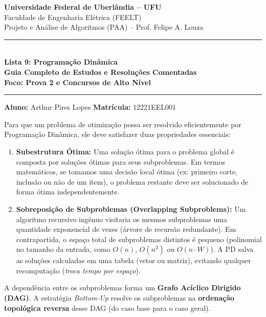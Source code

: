 \documentclass[11pt,a4paper]{article}
\begin{document}
\begin{center}
    {\Large \textbf{Universidade Federal de Uberlândia -- UFU}}\\[2pt]
    {\large Faculdade de Engenharia Elétrica (FEELT)}\\[2pt]
    {\large Projeto e Análise de Algoritmos (PAA) -- Prof. Felipe A. Louza}\\[4pt]
    \rule{\textwidth}{1pt}\\[5pt]
    {\LARGE \textbf{Lista 9: Programação Dinâmica}}\\[3pt]
    {\large \textbf{Guia Completo de Estudos e Resoluções Comentadas}}\\[3pt]
    \textbf{Foco: Prova 2 e Concursos de Alto Nível}\\[2pt]
    \rule{\textwidth}{0.5pt}
\end{center}

\vspace{0.1cm}
\noindent \textbf{Aluno:} Arthur Pires Lopes \quad \textbf{Matrícula:} 12221EEL001

\vspace{0.3cm}

\begin{teoria}
Para que um problema de otimização possa ser resolvido eficientemente por Programação Dinâmica, ele deve satisfazer duas propriedades essenciais:
\begin{enumerate}
    \item \textbf{Subestrutura Ótima:} Uma solução ótima para o problema global é composta por soluções ótimas para seus subproblemas. Em termos matemáticos, se tomamos uma decisão local ótima (ex: primeiro corte, inclusão ou não de um item), o problema restante deve ser solucionado de forma ótima independentemente.
    \item \textbf{Sobreposição de Subproblemas (Overlapping Subproblems):} Um algoritmo recursivo ingênuo visitaria os mesmos subproblemas uma quantidade exponencial de vezes (árvore de recursão redundante). Em contrapartida, o espaço total de subproblemas distintos é pequeno (polinomial no tamanho da entrada, como $O(n)$, $O(n^2)$ ou $O(n \cdot W)$). A PD salva as soluções calculadas em uma tabela (vetor ou matriz), evitando qualquer recomputação (\emph{troca tempo por espaço}).
\end{enumerate}
A dependência entre os subproblemas forma um \textbf{Grafo Acíclico Dirigido (DAG)}. A estratégia \emph{Bottom-Up} resolve os subproblemas na \textbf{ordenação topológica reversa} desse DAG (do caso base para o caso geral).
\end{teoria}
\end{document}
